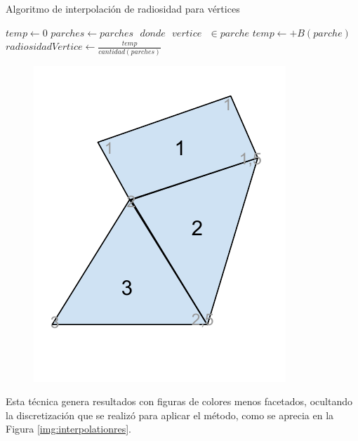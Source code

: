 \begin{algorithm}
	\caption{Algoritmo de interpolación de radiosidad para vértices}
	\label{alg:inter}
		\fontsize{8}{8}\selectfont
	\begin{algorithmic}
				\State $temp \gets 0$
				\State $parches \gets parches\text{ } donde\text{ } vertice\text{ } \in parche$
					\State $temp \gets +B(parche)$
				\EndLoop
				\State $radiosidadVertice \gets \frac{temp}{cantidad(parches)}$
			\EndLoop
		\EndFunction
	\end{algorithmic}
\end{algorithm}

\begin{figure}[htbp!]
	\centering
	\includegraphics[width=.3\linewidth]{assets/Interpolation}
	\label{img:interpolation}
\end{figure}

Esta técnica genera resultados con figuras de colores menos facetados, ocultando la discretización que se realizó para aplicar el método, como se aprecia en la Figura \ref{img:interpolationres}.

